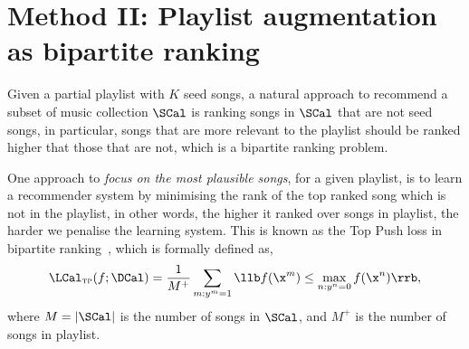 

%


%


\section{Method II: Playlist augmentation as bipartite ranking}

Given a partial playlist with $K$ seed songs, a natural approach to recommend a subset of music collection $\SCal$ is 
ranking songs in $\SCal$ that are not seed songs, in particular, songs that are more relevant to the playlist should be
ranked higher that those that are not, which is a bipartite ranking problem.




One approach to \emph{focus on the most plausible songs}, for a given playlist,
is to learn a recommender system by minimising the rank of the top ranked song which is not in the playlist,
in other words, the higher it ranked over songs in playlist, the harder we penalise the learning system.
This is known as the Top Push loss in bipartite ranking~\cite{li2014top}, which is formally defined as,
\begin{equation}
\label{eq:toppush}
\LCal_\textsc{tp}(f; \DCal) 
= \frac{1}{M^+} \sum_{m: y^m = 1} \llb f(\x^m) \le \max_{n: y^n = 0} f(\x^n) \rrb,
\end{equation}
where $M = |\SCal|$ is the number of songs in $\SCal$, and $M^+$ is the number of songs in playlist.

